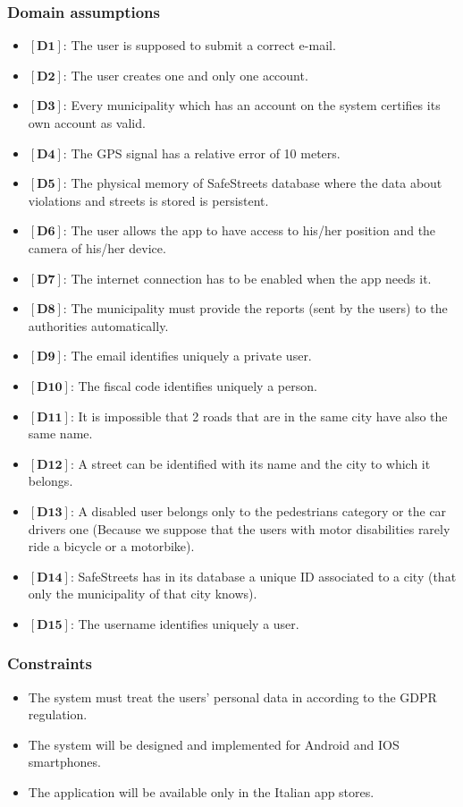 \documentclass[titlepage]{article}
\begin{document}
\subsubsection{Domain assumptions }
\begin{itemize}
	\item $[\textbf{D1}]$: The user is supposed to submit a correct e-mail.
	\item $[\textbf{D2}]$: The user creates one and only one account.
	\item $[\textbf{D3}]$: Every municipality which has an account on the system certifies its own account as valid.
	\item $[\textbf{D4}]$: The GPS signal has a relative error of 10 meters.
	\item $[\textbf{D5}]$: The physical memory of SafeStreets database where the data about violations and streets is stored is persistent.
	\item$[\textbf{D6}]$: The user allows the app to have access to his/her position and the camera of his/her device.
	\item $[\textbf{D7}]$: The internet connection has to be enabled when the app needs it.
	\item $[\textbf{D8}]$: The municipality must provide the reports (sent by the users) to the authorities automatically.
	\item $[\textbf{D9}]$: The email identifies uniquely a private user.
	\item $[\textbf{D10}]$: The fiscal code identifies uniquely a person.
	\item $[\textbf{D11}]$: It is impossible that 2 roads that are in the same city have also the same name.
	\item $[\textbf{D12}]$: A street can be identified with its name and the city to which it belongs.
	\item $[\textbf{D13}]$: A disabled user belongs only to the pedestrians category or the car drivers one (Because we suppose that the users with motor disabilities rarely ride a bicycle or a motorbike).
	\item $[\textbf{D14}]$: SafeStreets has in its database a unique ID associated to a city (that only the municipality of that city knows).
	\item $[\textbf{D15}]$: The username identifies uniquely a user.
	
\end{itemize}
\subsubsection{Constraints }
\begin{itemize}
	\item  The system must treat the users' personal data in according to the GDPR regulation.
	\item The system will be designed and implemented for Android and IOS smartphones.
	\item The application will be available only in the Italian app stores.
\end{itemize}
\end{document}
